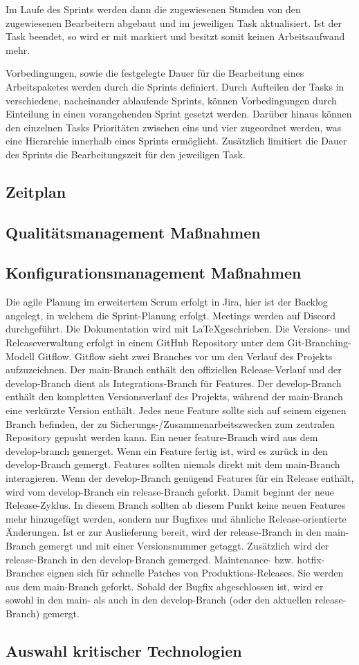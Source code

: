 Im Laufe des Sprints werden dann die zugewiesenen Stunden von den zugewiesenen Bearbeitern abgebaut und im jeweiligen Task aktualisiert.
Ist der Task beendet, so wird er mit  markiert und besitzt somit keinen Arbeitsaufwand mehr.

Vorbedingungen, sowie die festgelegte Dauer für die Bearbeitung eines Arbeitspaketes werden durch die Sprints definiert. 
Durch Aufteilen der Tasks in verschiedene, nacheinander ablaufende Sprints, können Vorbedingungen durch Einteilung in einen vorangehenden Sprint gesetzt werden.
Darüber hinaus können den einzelnen Tasks Prioritäten zwischen eins und vier zugeordnet werden, was eine Hierarchie innerhalb eines Sprints ermöglicht.
Zusätzlich limitiert die Dauer des Sprints die Bearbeitungszeit für den jeweiligen Task.
\subsection{Zeitplan}
\subsection{Qualitätsmanagement Maßnahmen}
\subsection{Konfigurationsmanagement Maßnahmen}
Die agile Planung im erweitertem Scrum erfolgt in Jira, hier ist der Backlog angelegt, in welchem die Sprint-Planung erfolgt. Meetings werden auf Discord durchgeführt. Die Dokumentation wird mit \LaTeX  geschrieben.\newline
Die Versions- und Releaseverwaltung erfolgt in einem GitHub Repository unter dem Git-Branching-Modell Gitflow. Gitflow sieht zwei Branches vor um den Verlauf des Projekts aufzuzeichnen. Der main-Branch enthält den offiziellen Release-Verlauf und der develop-Branch dient als Integrations-Branch für Features. Der develop-Branch enthält den kompletten Versionsverlauf des Projekts, während der main-Branch eine verkürzte Version enthält.\newline
Jedes neue Feature sollte sich auf seinem eigenen Branch befinden, der zu Sicherungs-/Zusammenarbeitszwecken zum zentralen Repository gepusht werden kann. Ein neuer feature-Branch  wird aus dem develop-branch gemerget. Wenn ein Feature fertig ist, wird es zurück in den develop-Branch gemergt. Features sollten niemals direkt mit dem main-Branch interagieren.\newline
Wenn der develop-Branch genügend Features für ein Release enthält, wird vom develop-Branch ein release-Branch geforkt. Damit beginnt der neue Release-Zyklus. In diesem Branch sollten ab diesem Punkt keine neuen Features mehr hinzugefügt werden, sondern nur Bugfixes und ähnliche Release-orientierte Änderungen. Ist er zur Auslieferung bereit, wird der release-Branch in den main-Branch gemergt und mit einer Versionsnummer getaggt. Zusätzlich wird der release-Branch in den develop-Branch gemerged. \newline
Maintenance- bzw. hotfix-Branches eignen sich für schnelle Patches von Produktions-Releases. Sie werden aus dem main-Branch geforkt. Sobald der Bugfix abgeschlossen ist, wird er sowohl in den main- als auch in den develop-Branch (oder den aktuellen release-Branch) gemergt.
\subsection{Auswahl kritischer Technologien}





